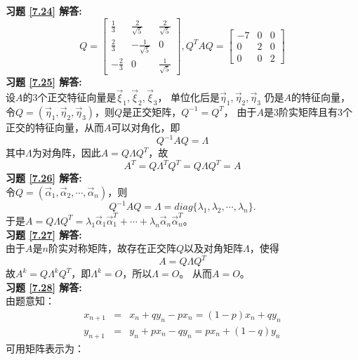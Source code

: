\documentclass[a4paper]{book}
\begin{document}
\textbf{习题 \ref{7.24} 解答:}\\
\begin{equation*}
  Q=\begin{bmatrix}\frac{1}{3}&\frac{2}{\sqrt{5}}&\frac{2}{\sqrt{5}}
       \\ \frac{2}{3}&-\frac{1}{\sqrt{5}}&0\\-\frac{2}{3}&0&\frac{1}{\sqrt{5}}\end{bmatrix},
  Q^TAQ=\begin{bmatrix}-7&0&0\\0&2&0\\0&0&2\end{bmatrix}
\end{equation*}
\textbf{习题 \ref{7.25} 解答:}\\
设$A$的3个正交特征向量是$\vec{\xi}_1,\vec{\xi}_2,\vec{\xi}_3$，
单位化后是$\vec{\eta}_1,\vec{\eta}_2,\vec{\eta}_3$ 仍是$A$的特征向量，
令$Q=(\vec{\eta}_1,\vec{\eta}_2,\vec{\eta}_3)$，则$Q$是正交矩阵，$Q^{-1}=Q^T$，
由于$A$是3阶实矩阵且有3个正交的特征向量，从而$A$可以对角化，即
\begin{equation*}
  Q^{-1}AQ=\Lambda
\end{equation*}
其中$\Lambda$为对角阵，因此$A=Q\Lambda Q^T$，故
\begin{equation*}
  A^T=Q\Lambda^TQ^T=Q\Lambda Q^T=A
\end{equation*}
\textbf{习题 \ref{7.26} 解答:}\\
令$Q=(\vec{\alpha}_1,\vec{\alpha}_2,\cdots,\vec{\alpha}_n)$，则
\begin{equation*}
  Q^{-1}AQ=\Lambda=diag\{\lambda_1,\lambda_2,\cdots,\lambda_n\}.
\end{equation*}
于是$A=Q\Lambda Q^T=\lambda_1\vec{\alpha}_1\vec{\alpha}_1^T+\cdots+\lambda_n\vec{\alpha}_n\vec{\alpha}_n^T$。\\
\textbf{习题 \ref{7.27} 解答:}\\
由于$A$是$n$阶实对称矩阵，故存在正交阵$Q$以及对角矩阵$\Lambda$，使得
\begin{equation*}
  A=Q\Lambda Q^T
\end{equation*}
故$A^{k}=Q\Lambda^kQ^T$，即$\Lambda^k=O$，所以$\Lambda=O$。 从而$A=O$。\\
\textbf{习题 \ref{7.28} 解答:}\\
由题意知：
\begin{eqnarray*}
  x_{n+1} &=& x_n+qy_n-px_n=(1-p)x_n+qy_n \\
  y_{n+1} &=& y_n+px_n-qy_n=px_n+(1-q)y_n
\end{eqnarray*}
可用矩阵表示为：
\end{document}
